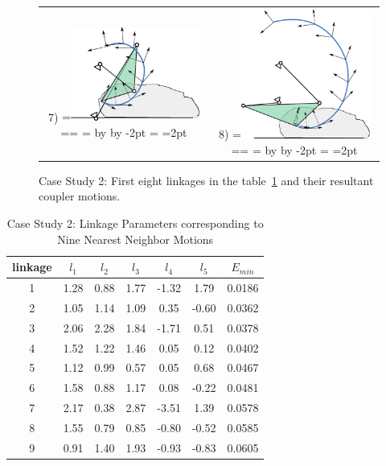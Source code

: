 \documentclass[twocolumn,10pt]{asme2e}
\makeatletter
\newcommand{\putindeepbox}[2][0.7\baselineskip]{{%
    \setbox0=\hbox{#2}%
    \setbox0=\vbox{\noindent\hsize=\wd0\unhbox0}
    \@tempdima=\dp0
    \advance\@tempdima by \ht0
    \advance\@tempdima by -#1\relax
    \dp0=\@tempdima
    \ht0=#1\relax
    \box0
}}
\makeatother
\begin{document}
\begin{figure}
\begin{tabular}{cc}
  7)\putindeepbox[2pt]{\includegraphics[width=120pt]{figure/sol8.eps}}
    & 8)\putindeepbox[2pt]{\includegraphics[width=120pt]{figure/sol9.eps}}\\
\end{tabular}
\caption{Case Study 2: First eight linkages in the table~\ref{ex2_knnLinkageData} and their resultant coupler motions.}
\label{ex2_solns}
\end{figure}

\begin{table}
\caption{Case Study 2: Linkage Parameters corresponding to Nine Nearest Neighbor Motions}
\centering
\label{ex2_knnLinkageData}
\begin{tabular}{ccccccc}
\hline
  linkage & $l_1$ & $l_2$ & $l_3$ & $l_4$ & $l_5$ & $E_{min}$ \\
\hline
 1 & 1.28 & 0.88 & 1.77 & -1.32 & 1.79 & 0.0186   \\
 2 & 1.05 & 1.14 & 1.09 & 0.35 & -0.60 & 0.0362   \\
 3 & 2.06 & 2.28 & 1.84 & -1.71 & 0.51 & 0.0378   \\
 4 & 1.52 & 1.22 & 1.46 & 0.05 & 0.12 & 0.0402    \\
 5 & 1.12 & 0.99 & 0.57 & 0.05 & 0.68 & 0.0467    \\
 6 & 1.58 & 0.88 & 1.17 & 0.08 & -0.22 & 0.0481   \\
 7 & 2.17 & 0.38 & 2.87 & -3.51 & 1.39 & 0.0578   \\
 8 & 1.55 & 0.79 & 0.85 & -0.80 & -0.52 & 0.0585  \\
 9 & 0.91 & 1.40 & 1.93 & -0.93 & -0.83 & 0.0605
\end{tabular}
\end{table}
\end{document}
